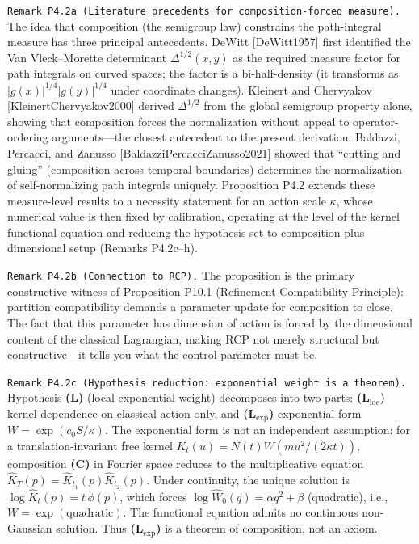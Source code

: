 \documentclass[
]{article}
\begin{document}
\texttt{Remark\ P4.2a\textquotesingle{}\ (Literature\ precedents\ for\ composition-forced\ measure).}
The idea that composition (the semigroup law) constrains the
path-integral measure has three principal antecedents. DeWitt
{[}DeWitt1957{]} first identified the Van Vleck--Morette determinant
\(\Delta^{1/2}(x,y)\) as the required measure factor for path integrals
on curved spaces; the factor is a bi-half-density (it transforms as
\(|g(x)|^{1/4}|g(y)|^{1/4}\) under coordinate changes). Kleinert and
Chervyakov {[}KleinertChervyakov2000{]} derived \(\Delta^{1/2}\) from
the global semigroup property alone, showing that composition forces the
normalization without appeal to operator-ordering arguments---the
closest antecedent to the present derivation. Baldazzi, Percacci, and
Zanusso {[}BaldazziPercacciZanusso2021{]} showed that ``cutting and
gluing'' (composition across temporal boundaries) determines the
normalization of self-normalizing path integrals uniquely. Proposition
P4.2 extends these measure-level results to a necessity statement for an
action scale \(\kappa\), whose numerical value is then fixed by
calibration, operating at the level of the kernel functional equation
and reducing the hypothesis set to composition plus dimensional setup
(Remarks P4.2c--h).

\texttt{Remark\ P4.2b\ (Connection\ to\ RCP).} The proposition is the
primary constructive witness of Proposition P10.1 (Refinement
Compatibility Principle): partition compatibility demands a parameter
update for composition to close. The fact that this parameter has
dimension of action is forced by the dimensional content of the
classical Lagrangian, making RCP not merely structural but
constructive---it tells you what the control parameter must be.

\texttt{Remark\ P4.2c\ (Hypothesis\ reduction:\ exponential\ weight\ is\ a\ theorem).}
Hypothesis \textbf{(L)} (local exponential weight) decomposes into two
parts: \textbf{(L\(_{\mathrm{loc}}\))} kernel dependence on classical
action only, and \textbf{(L\(_{\mathrm{exp}}\))} exponential form
\(W=\exp(c_0 S/\kappa)\). The exponential form is not an independent
assumption: for a translation-invariant free kernel
\(K_t(u)=N(t)W(mu^2/(2\kappa t))\), composition \textbf{(C)} in Fourier
space reduces to the multiplicative equation
\(\hat K_T(p)=\hat K_{t_1}(p)\hat K_{t_2}(p)\). Under continuity, the
unique solution is \(\log\hat K_t(p)=t\,\phi(p)\), which forces
\(\log\hat W_0(q)=\alpha q^2+\beta\) (quadratic), i.e.,
\(W=\exp(\text{quadratic})\). The functional equation admits no
continuous non-Gaussian solution. Thus \textbf{(L\(_{\mathrm{exp}}\))}
is a theorem of composition, not an axiom.
\end{document}
